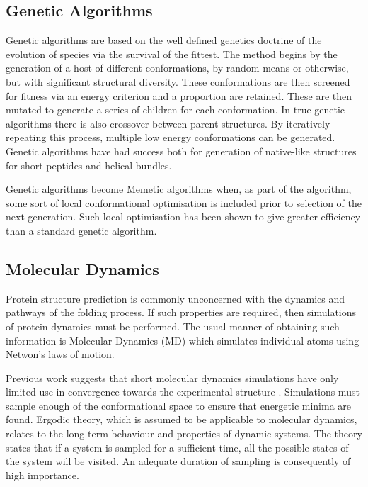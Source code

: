 \subsection{Genetic Algorithms}

Genetic algorithms are based on the well defined genetics  doctrine of the
evolution of species via the survival of the fittest. The method begins by the generation of a host of  different conformations, by random means or otherwise, but with significant structural diversity. These conformations are then screened for fitness via an energy criterion and a proportion are retained. These are then mutated to generate a series of children for each conformation. In true genetic algorithms there is also crossover between parent structures.
By iteratively repeating this process, multiple low energy conformations
can be generated. Genetic algorithms have had success both for generation of native-like structures for short peptides\cite{COMPCHEM:Gib2001,SIMULATION:Genetic} and helical bundles\cite{SIMULATION:Genetic:HBundle}.

Genetic algorithms become Memetic algorithms when, as part of the algorithm,
some sort of local conformational optimisation is included prior to selection of the next generation. Such local optimisation has been shown to give greater
efficiency than a standard genetic algorithm\cite{SIMULATION:Memetic}. 




\subsection{Molecular Dynamics}

Protein structure prediction is commonly unconcerned with the dynamics and
pathways of the  folding process. If such properties are required, then simulations
of protein
dynamics must be performed. The usual manner of obtaining such information
is Molecular Dynamics (MD) which simulates individual atoms using
Netwon's laws of motion.

Previous work suggests that short molecular dynamics simulations have only limited use in convergence towards the experimental structure \cite{NATIVE:Venclovas1999}.
Simulations must sample enough of the conformational space to ensure that energetic minima are found. Ergodic theory, which is assumed to be applicable to molecular dynamics, relates to the long-term behaviour and properties of dynamic systems. The theory states that if a system is sampled for a sufficient time, all the possible states of the system will be visited. An adequate duration of sampling is consequently of high importance. 

